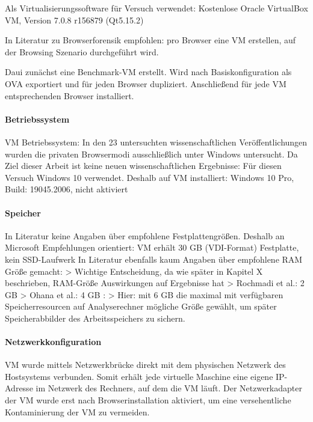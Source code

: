 Als Virtualisierungssoftware für Versuch verwendet: Kostenlose Oracle VirtualBox VM, Version 7.0.8 r156879 (Qt5.15.2)

In Literatur zu Browserforensik empfohlen: pro Browser eine VM erstellen, auf der Browsing Szenario durchgeführt wird.

Daui zunächst eine Benchmark-VM erstellt. Wird nach Basiskonfiguration als OVA exportiert und für jeden Browser dupliziert. Anschließend für jede VM entsprechenden Browser installiert.

\paragraph*{Betriebssystem}
VM Betriebssystem: In den 23 untersuchten wissenschaftlichen Veröffentlichungen wurden die privaten Browsermodi ausschließlich unter Windows untersucht.
Da Ziel dieser Arbeit ist keine neuen wissenschaftlichen Ergebnisse: Für diesen Versuch Windows 10 verwendet.
Deshalb auf VM installiert: Windows 10 Pro, Build: 19045.2006, nicht aktiviert

\paragraph*{Speicher}
In Literatur keine Angaben über empfohlene Festplattengrößen.
Deshalb an Microsoft Empfehlungen orientiert: VM erhält 30 GB (VDI-Format) Festplatte, kein SSD-Laufwerk
In Literatur ebenfalls kaum Angaben über empfohlene RAM Größe gemacht:
> Wichtige Entscheidung, da wie später in Kapitel X beschrieben, RAM-Größe Auswirkungen auf Ergebnisse hat
> Rochmadi et al.: 2 GB \cite{Rochmadi.2017}
> Ohana et al.: 4 GB \cite{Ohana.2013}: 
> Hier: mit 6 GB die maximal mit verfügbaren Speicherresourcen auf Analyserechner mögliche Größe gewählt, um später Speicherabbilder des Arbeitsspeichers zu sichern.

\paragraph*{Netzwerkkonfiguration}
VM wurde mittels Netzwerkbrücke direkt mit dem physischen Netzwerk des Hostsystems verbunden. Somit erhält jede virtuelle Maschine eine eigene IP-Adresse im Netzwerk des Rechners, auf dem die VM läuft.
Der Netzwerkadapter der VM wurde erst nach Browserinstallation aktiviert, um eine versehentliche Kontaminierung der VM zu vermeiden.

